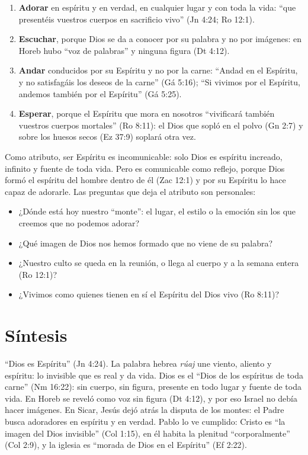 \documentclass[11pt,letterpaper]{article}
\begin{document}
\begin{enumerate}
\item \textbf{Adorar} en espíritu y en verdad, en cualquier lugar y con toda la vida: ``que presentéis vuestros cuerpos en sacrificio vivo'' (Jn 4:24; Ro 12:1).
\item \textbf{Escuchar}, porque Dios se da a conocer por su palabra y no por imágenes: en Horeb hubo ``voz de palabras'' y ninguna figura (Dt 4:12).
\item \textbf{Andar} conducidos por su Espíritu y no por la carne: ``Andad en el Espíritu, y no satisfagáis los deseos de la carne'' (Gá 5:16); ``Si vivimos por el Espíritu, andemos también por el Espíritu'' (Gá 5:25).
\item \textbf{Esperar}, porque el Espíritu que mora en nosotros ``vivificará también vuestros cuerpos mortales'' (Ro 8:11): el Dios que sopló en el polvo (Gn 2:7) y sobre los huesos secos (Ez 37:9) soplará otra vez.
\end{enumerate}

Como atributo, ser Espíritu es incomunicable: solo Dios es espíritu increado, infinito y fuente de toda vida. Pero es comunicable como reflejo, porque Dios formó el espíritu del hombre dentro de él (Zac 12:1) y por su Espíritu lo hace capaz de adorarle. Las preguntas que deja el atributo son personales:

\begin{itemize}
\item ¿Dónde está hoy nuestro ``monte'': el lugar, el estilo o la emoción sin los que creemos que no podemos adorar?
\item ¿Qué imagen de Dios nos hemos formado que no viene de su palabra?
\item ¿Nuestro culto se queda en la reunión, o llega al cuerpo y a la semana entera (Ro 12:1)?
\item ¿Vivimos como quienes tienen en sí el Espíritu del Dios vivo (Ro 8:11)?
\end{itemize}

\section{Síntesis}

\begin{tcolorbox}[colback=papiro,colframe=azul,boxrule=1pt,arc=3pt]
``Dios es Espíritu'' (Jn 4:24). La palabra hebrea \emph{rúaj} une viento, aliento y espíritu: lo invisible que es real y da vida. Dios es el ``Dios de los espíritus de toda carne'' (Nm 16:22): sin cuerpo, sin figura, presente en todo lugar y fuente de toda vida. En Horeb se reveló como voz sin figura (Dt 4:12), y por eso Israel no debía hacer imágenes. En Sicar, Jesús dejó atrás la disputa de los montes: el Padre busca adoradores en espíritu y en verdad. Pablo lo ve cumplido: Cristo es ``la imagen del Dios invisible'' (Col 1:15), en él habita la plenitud ``corporalmente'' (Col 2:9), y la iglesia es ``morada de Dios en el Espíritu'' (Ef 2:22).
\end{tcolorbox}
\end{document}
